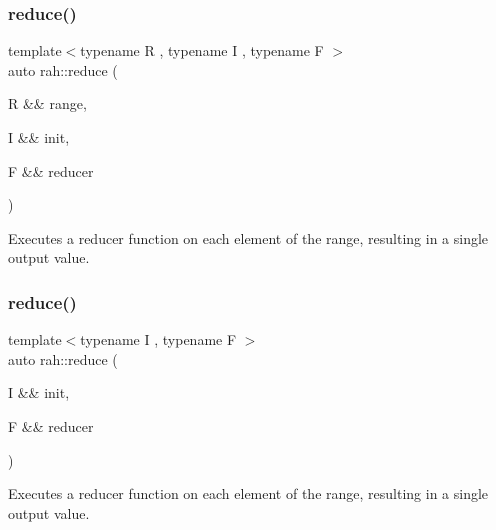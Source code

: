 \mbox{\label{namespacerah_a407b50a4f029e3f2a3cd0ba9142aea84}} 
\subsubsection{\texorpdfstring{reduce()}{reduce()}\hspace{0.1cm}{\footnotesize\ttfamily [1/2]}}
{\footnotesize\ttfamily template$<$typename R , typename I , typename F $>$ \\
auto rah\+::reduce (\begin{DoxyParamCaption}\item[{R \&\&}]{range,  }\item[{I \&\&}]{init,  }\item[{F \&\&}]{reducer }\end{DoxyParamCaption})}



Executes a reducer function on each element of the range, resulting in a single output value. 


\begin{DoxyCodeInclude}{0}
\end{DoxyCodeInclude}
\mbox{\label{namespacerah_a6a6b7b7e3b78bb4bd16372fbb688c152}} 
\subsubsection{\texorpdfstring{reduce()}{reduce()}\hspace{0.1cm}{\footnotesize\ttfamily [2/2]}}
{\footnotesize\ttfamily template$<$typename I , typename F $>$ \\
auto rah\+::reduce (\begin{DoxyParamCaption}\item[{I \&\&}]{init,  }\item[{F \&\&}]{reducer }\end{DoxyParamCaption})}



Executes a reducer function on each element of the range, resulting in a single output value. 

